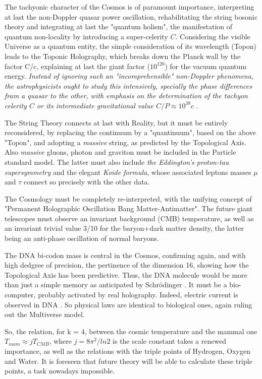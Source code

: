 \documentclass[a4paper,9pt]{article}
\begin{document}
The tachyonic character of the Cosmos is of paramount importance, interpreting at last the non-Doppler quasar power oscillation, rehabilitating the string bosonic theory and integrating at last the "quantum holism", the manifestation of quantum non-locality by introducing a super-celerity $C$. Considering the visible Universe as a quantum entity, the simple consideration of its wavelength (Topon) leads to the Toponic Holography, which breaks down the Planck wall by the factor C/c, explaining at last the giant factor ($10^{120}$) for the vacuum quantum energy. \textit{Instead of ignoring such an "incomprehensible" non-Doppler phenomena, the astrophysicists ought to study this intensively, specially the phase differences fram a quasar to the other, with emphasis on the determination of the tachyon celerity $C$ or its intermediate gravitational value $C/P \approx 10^{38}c$} \cite{Sanchez3}. 

The String Theory connects at last with Reality, but it must be entirely reconsidered, by replacing the continuum by a "quantinuum", based on the above "Topon", and adopting a \textit{massive} string, as predicted by the Topological Axis. Also \textit{massive} gluons, photon and graviton must be included in the Particle standard model. The latter must also include \textit{the Eddington's proton-tau supersymmetry} and the elegant \textit{Koide formula}, whose associated leptons masses $\mu$ and $\tau $ connect so precisely with the other data.

The Cosmology must be completely re-interpreted, with the unifying concept of "Permanent Holographic Oscillation Bang Matter-Antimatter". The future giant telescopes must observe an invariant background (CMB) temperature, as well as an invariant trivial value 3/10 \cite{Sanchez3} for the baryon+dark matter density, the latter being an anti-phase oscillation of normal baryons.

The DNA bi-codon mass is central in the Cosmos, confirming again, and with high dedgree of precision, the pertinence of the dimension 16, showing how the Topological Axis has been predictive. Thus, the DNA molecule would be more than just a simple memory as anticipated by Schrödinger \cite{Schrodinger}. It must be a bio-computer, probably activated by real holography. Indeed, electric current is observed in DNA \cite{Montagnier}. So physical laws are identical to biological ones, again ruling out the Multiverse model.

So, the relation, for k = 4, between the cosmic temperature and the mammal one $T_{mam}\approx jT_{CMB}$, where $j =  8 \pi^2/ln2$ is the scale constant \cite {Sanchez3} takes a renewed importance, as well as the relations with the triple points of Hydrogen, Oxygen and Water. It is foreseen that future theory will be able to calculate these triple points, a task nowadays impossible.
\end{document}
